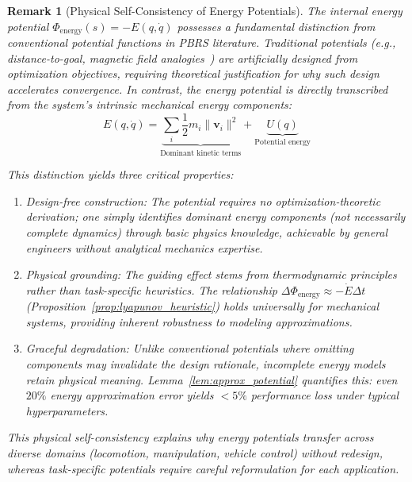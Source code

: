 \documentclass[journal]{IEEEtran}
\newtheorem*{remark}{Remark}
\begin{document}
	\begin{remark}[Physical Self-Consistency of Energy Potentials]
		\label{rem:physical_self_consistency}
		The internal energy potential $\Phi_{\text{energy}}(s) = -E(q,\dot{q})$ possesses a fundamental distinction from conventional potential functions in PBRS literature. Traditional potentials (e.g., distance-to-goal, magnetic field analogies~\cite{ding2023magnetic}) are \textit{artificially designed} from optimization objectives, requiring theoretical justification for why such design accelerates convergence. In contrast, the energy potential is \textit{directly transcribed} from the system's intrinsic mechanical energy components:
		\begin{equation}
			E(q,\dot{q}) = \underbrace{\sum_i \frac{1}{2}m_i\|\mathbf{v}_i\|^2}_{\text{Dominant kinetic terms}} + \underbrace{U(q)}_{\text{Potential energy}}
		\end{equation}
		
		This distinction yields three critical properties:
		\begin{enumerate}
			\item Design-free construction: The potential requires no optimization-theoretic derivation; one simply identifies dominant energy components (not necessarily complete dynamics) through basic physics knowledge, achievable by general engineers without analytical mechanics expertise.
			
			\item Physical grounding: The guiding effect stems from thermodynamic principles rather than task-specific heuristics. The relationship $\Delta\Phi_{\text{energy}} \approx -\dot{E}\Delta t$ (Proposition~\ref{prop:lyapunov_heuristic}) holds universally for mechanical systems, providing inherent robustness to modeling approximations.
			
			\item Graceful degradation: Unlike conventional potentials where omitting components may invalidate the design rationale, incomplete energy models retain physical meaning. Lemma~\ref{lem:approx_potential} quantifies this: even $20\%$ energy approximation error yields $<5\%$ performance loss under typical hyperparameters.
		\end{enumerate}
		
		This physical self-consistency explains why energy potentials transfer across diverse domains (locomotion, manipulation, vehicle control) without redesign, whereas task-specific potentials require careful reformulation for each application.
	\end{remark}
	
\end{document}
